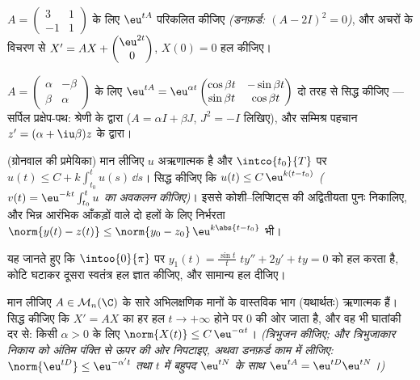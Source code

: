 \begin{exercise}[$\star\star$]\label{exo:b2:diffeq:4}
$A = \begin{pmatrix} 3 & 1\\ -1 &
1\end{pmatrix}$ के लिए $\eu^{tA}$ परिकलित कीजिए \emph{(डनफ़र्ड: $(A - 2I)^2 = 0$)}, और अचरों के विचरण से
$X' =
AX + \begin{pmatrix} \eu^{2t}\\ 0\end{pmatrix}$, $X(0) = 0$ हल कीजिए।
\end{exercise}

\begin{exercise}[$\star\star$]\label{exo:b2:diffeq:5}
$A = \begin{pmatrix} \alpha & -\beta\\ \beta &
\alpha\end{pmatrix}$ के लिए $\eu^{tA} =
\eu^{\alpha t}\begin{pmatrix} \cos\beta t & -\sin\beta t\\
\sin\beta t & \cos\beta t\end{pmatrix}$ दो तरह से सिद्ध कीजिए --- सर्पिल प्रक्षेप-पथ: श्रेणी के
द्वारा ($A = \alpha I + \beta J$, $J^2 =
-I$ लिखिए), और सम्मिश्र पहचान $z' = (\alpha +
\iu\beta)z$ के द्वारा।
\end{exercise}

\begin{exercise}[$\star\star$]\label{exo:b2:diffeq:6}
(ग्रोनवाल की प्रमेयिका) मान लीजिए $u$  अऋणात्मक है और $\intco{t_0}{T}$ पर $u(t)
\leq C + k\int_{t_0}^{t} u(s)\,\dd s$।
सिद्ध कीजिए कि $u(t) \leq C\,\eu^{k(t - t_0)}$ \emph{($v(t) =
\eu^{-kt}\int_{t_0}^t u$ का अवकलन कीजिए)}। इससे कोशी--लिप्शिट्स की
अद्वितीयता पुनः निकालिए, और भिन्न आरंभिक आँकड़ों वाले दो हलों के लिए 
निर्भरता $\norm{y(t) -
z(t)} \leq \norm{y_0 - z_0}\,\eu^{k\abs{t - t_0}}$ भी।
\end{exercise}

\begin{exercise}[$\star\star$]\label{exo:b2:diffeq:7}
यह जानते हुए कि $\intoo{0}{\pi}$ पर $y_1(t) = \frac{\sin t}{t}$ $ty'' + 2y' + ty =
0$ को हल करता है, कोटि घटाकर दूसरा स्वतंत्र
हल ज्ञात कीजिए, और सामान्य हल दीजिए।
\end{exercise}

\begin{exercise}[$\star\star\star$]\label{exo:b2:diffeq:8}
मान लीजिए $A \in \mathcal{M}_n(\C)$ के सारे अभिलक्षणिक मानों के वास्तविक भाग (यथार्थतः) ऋणात्मक
हैं। सिद्ध कीजिए कि $X' = AX$ का हर हल $t \to +\infty$ होने पर $0$ की ओर जाता है, और वह भी
घातांकी दर से: किसी $\alpha > 0$ के लिए $\norm{X(t)}
\leq C\,\eu^{-\alpha t}$। \emph{(त्रिभुजन कीजिए; और त्रिभुजाकार
निकाय को अंतिम पंक्ति से ऊपर की ओर निपटाइए, अथवा डनफ़र्ड काम में लीजिए:
$\norm{\eu^{tD}} \leq \eu^{-\alpha' t}$ तथा $t$ में बहुपद $\eu^{tN}$ के साथ $\eu^{tA} = \eu^{tD}\eu^{tN}$।)}
\end{exercise}

